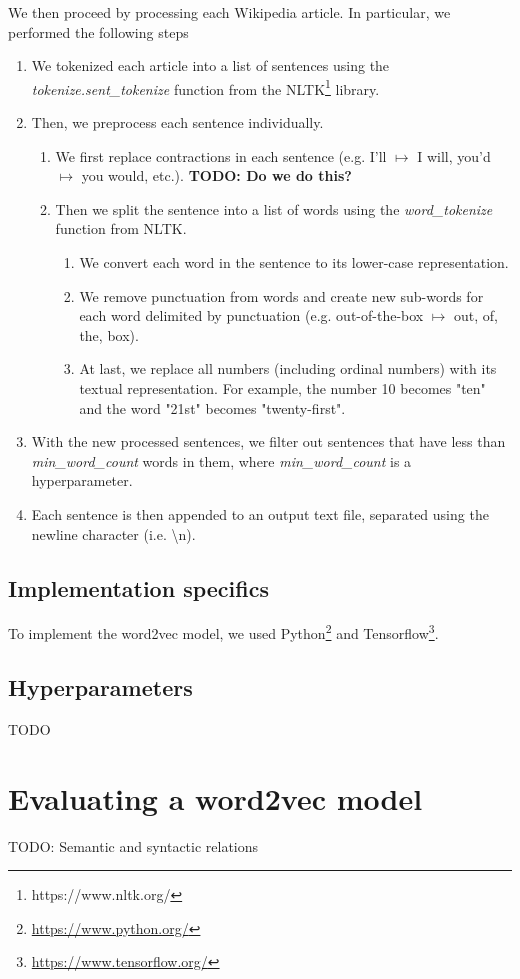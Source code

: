\noindent
We then proceed by processing each Wikipedia article. In particular, we performed the following steps
\begin{enumerate}
    \item We tokenized each article into a list of sentences using the \textit{tokenize.sent\_tokenize} function from the NLTK\footnote{https://www.nltk.org/} library.
    \item Then, we preprocess each sentence individually.
    \begin{enumerate}
        \item We first replace contractions in each sentence (e.g. I'll $\mapsto$ I will, you'd $\mapsto$ you would, etc.). \textbf{TODO: Do we do this?}
        \item Then we split the sentence into a list of words using the \textit{word\_tokenize} function from NLTK.
        \begin{enumerate}
            \item We convert each word in the sentence to its lower-case representation.
            \item We remove punctuation from words and create new sub-words for each word delimited by punctuation (e.g. out-of-the-box $\mapsto$ out, of, the, box).
            \item At last, we replace all numbers (including ordinal numbers) with its textual representation. For example, the number 10 becomes "ten" and the word "21st" becomes "twenty-first".
        \end{enumerate}
    \end{enumerate}
    \item With the new processed sentences, we filter out sentences that have less than \textit{min\_word\_count} words in them, where \textit{min\_word\_count} is a hyperparameter.
    \item Each sentence is then appended to an output text file, separated using the newline character (i.e. \textbackslash n).
\end{enumerate}

\subsection{Implementation specifics}
To implement the word2vec model, we used Python\footnote{\url{https://www.python.org/}} and Tensorflow\footnote{\url{https://www.tensorflow.org/}}.

\subsection{Hyperparameters}
TODO

\section{Evaluating a word2vec model}
TODO: Semantic and syntactic relations